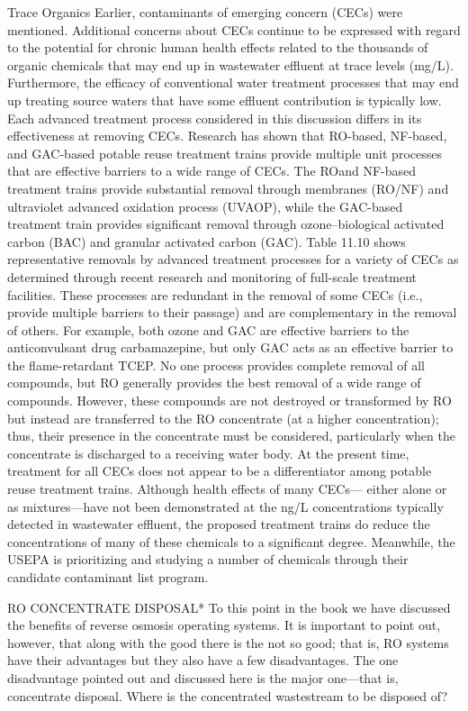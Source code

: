 \documentclass{article}
\begin{document}
Trace Organics Earlier, contaminants of emerging concern (CECs) were
mentioned. Additional concerns about CECs continue to be expressed with
regard to the potential for chronic human health effects related to the
thousands of organic chemicals that may end up in wastewater effluent at
trace levels (mg/L). Furthermore, the efficacy of conventional water
treatment processes that may end up treating source waters that have
some effluent contribution is typically low. Each advanced treatment
process considered in this discussion differs in its effectiveness at
removing CECs. Research has shown that RO-based, NF-based, and GAC-based
potable reuse treatment trains provide multiple unit processes that are
effective barriers to a wide range of CECs. The ROand NF-based treatment
trains provide substantial removal through membranes (RO/NF) and
ultraviolet advanced oxidation process (UVAOP), while the GAC-based
treatment train provides significant removal through ozone--biological
activated carbon (BAC) and granular activated carbon (GAC). Table 11.10
shows representative removals by advanced treatment processes for a
variety of CECs as determined through recent research and monitoring of
full-scale treatment facilities. These processes are redundant in the
removal of some CECs (i.e., provide multiple barriers to their passage)
and are complementary in the removal of others. For example, both ozone
and GAC are effective barriers to the anticonvulsant drug carbamazepine,
but only GAC acts as an effective barrier to the flame-retardant TCEP.
No one process provides complete removal of all compounds, but RO
generally provides the best removal of a wide range of compounds.
However, these compounds are not destroyed or transformed by RO but
instead are transferred to the RO concentrate (at a higher
concentration); thus, their presence in the concentrate must be
considered, particularly when the concentrate is discharged to a
receiving water body. At the present time, treatment for all CECs does
not appear to be a differentiator among potable reuse treatment trains.
Although health effects of many CECs--- either alone or as
mixtures---have not been demonstrated at the ng/L concentrations
typically detected in wastewater effluent, the proposed treatment trains
do reduce the concentrations of many of these chemicals to a significant
degree. Meanwhile, the USEPA is prioritizing and studying a number of
chemicals through their candidate contaminant list program.

RO CONCENTRATE DISPOSAL* To this point in the book we have discussed the
benefits of reverse osmosis operating systems. It is important to point
out, however, that along with the good there is the not so good; that
is, RO systems have their advantages but they also have a few
disadvantages. The one disadvantage pointed out and discussed here is
the major one---that is, concentrate disposal. Where is the concentrated
wastestream to be disposed of?
\end{document}
